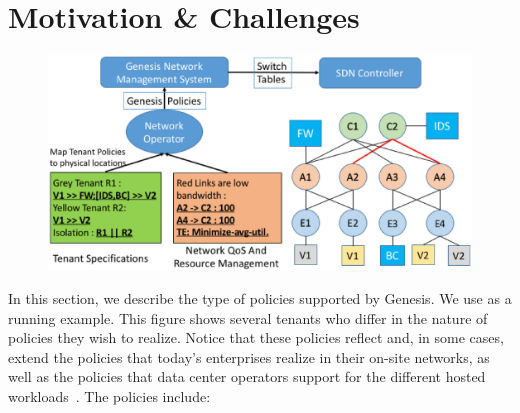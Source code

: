 \section{Motivation \& Challenges}
\begin{figure}
	\includegraphics[width=\columnwidth,center]{figures/architecture.eps}
	\label{fig:architecture}
\end{figure}
In this section, we describe the type of policies supported by
Genesis. %
We use  as a running example. This figure shows several
tenants who differ in the nature of policies they wish to realize. 
Notice that these policies reflect and, in some cases, extend the
policies that today's enterprises realize in their on-site networks, as
well as the policies that data center operators support for the different hosted
workloads~\cite{mpa-imc15}.  The policies include:





